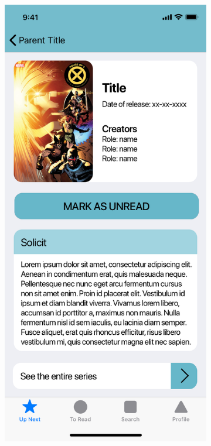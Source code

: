 \clearpage

\begin{figure}[p]
  \begin{subfigure}[b]{0.4\textwidth}
    \includegraphics[width=\textwidth]{img/mockups/issue}

\end{subfigure}
\end{figure}
